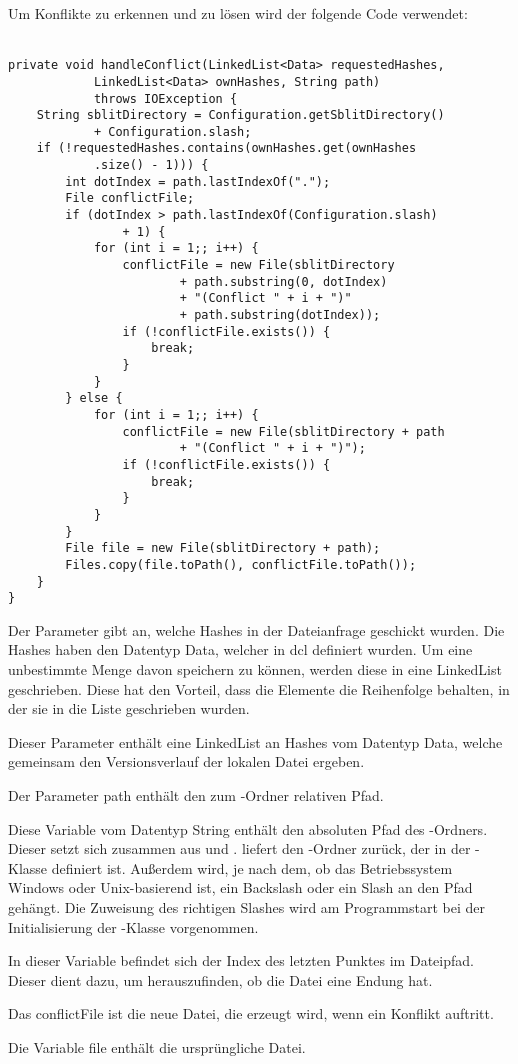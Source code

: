 Um Konflikte zu erkennen und zu lösen wird der folgende Code verwendet: \\ \\
\javalisting
\begin{minipage}{\linewidth}
\begin{lstlisting}[caption={Erkennen eines Konflikts},captionpos=b]
private void handleConflict(LinkedList<Data> requestedHashes,
			LinkedList<Data> ownHashes, String path)
			throws IOException {
	String sblitDirectory = Configuration.getSblitDirectory()
			+ Configuration.slash;
	if (!requestedHashes.contains(ownHashes.get(ownHashes
			.size() - 1))) {
		int dotIndex = path.lastIndexOf(".");
		File conflictFile;
		if (dotIndex > path.lastIndexOf(Configuration.slash) 
				+ 1) {
			for (int i = 1;; i++) {
				conflictFile = new File(sblitDirectory
						+ path.substring(0, dotIndex)
						+ "(Conflict " + i + ")"
						+ path.substring(dotIndex));
				if (!conflictFile.exists()) {
					break;
				}
			}
		} else {
			for (int i = 1;; i++) {
				conflictFile = new File(sblitDirectory + path
						+ "(Conflict " + i + ")");
				if (!conflictFile.exists()) {
					break;
				}
			}
		}
		File file = new File(sblitDirectory + path);
		Files.copy(file.toPath(), conflictFile.toPath());
	}
}
\end{lstlisting}
\end{minipage}
\begin{description}
	 Der Parameter gibt an, welche Hashes in der Dateianfrage geschickt wurden. Die Hashes haben den Datentyp Data, welcher in \gls{dcl} definiert wurden. Um eine unbestimmte Menge davon speichern zu können, werden diese in eine LinkedList geschrieben. Diese hat den Vorteil, dass die Elemente die Reihenfolge behalten, in der sie in die Liste geschrieben wurden.
	
	 Dieser Parameter enthält eine LinkedList an Hashes vom Datentyp Data, welche gemeinsam den Versionsverlauf der lokalen Datei ergeben. 
	
	 Der Parameter path enthält den zum \sblit-Ordner relativen Pfad.
	
	 Diese Variable vom Datentyp String enthält den absoluten Pfad des \sblit-Ordners. Dieser setzt sich zusammen aus  und .  liefert den \sblit-Ordner zurück, der in der -Klasse definiert ist. Außerdem wird, je nach dem, ob das Betriebssystem Windows oder Unix-basierend ist, ein Backslash oder ein Slash an den Pfad gehängt. Die Zuweisung des richtigen Slashes wird am Programmstart bei der Initialisierung der -Klasse vorgenommen.

	 In dieser Variable befindet sich der Index des letzten Punktes im Dateipfad. Dieser dient dazu, um herauszufinden, ob die Datei eine Endung hat.
	
	 Das conflictFile ist die neue Datei, die erzeugt wird, wenn ein Konflikt auftritt.
	
	 Die Variable file enthält die ursprüngliche Datei.
\end{description}
